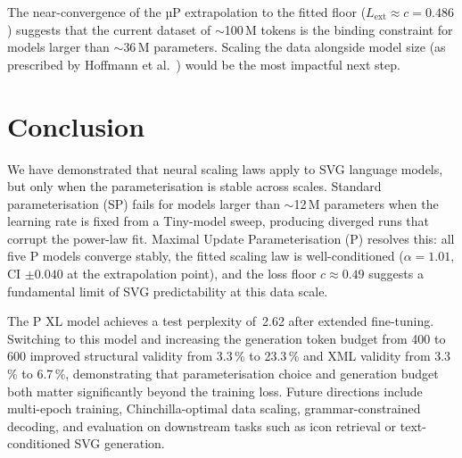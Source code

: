 \documentclass[11pt,a4paper]{article}
\begin{document}
The near-convergence of the µP extrapolation to the fitted floor ($L_\text{ext} \approx c
= 0.486$) suggests that the current dataset of $\sim$100\,M tokens is the binding
constraint for models larger than $\sim$36\,M parameters.  Scaling the data alongside
model size (as prescribed by Hoffmann et al.\ \citeyearpar{hoffmann2022chinchilla}) would
be the most impactful next step.

\section{Conclusion}

We have demonstrated that neural scaling laws apply to SVG language models, but only
when the parameterisation is stable across scales.  Standard parameterisation (SP) fails
for models larger than $\sim$12\,M parameters when the learning rate is fixed from a
Tiny-model sweep, producing diverged runs that corrupt the power-law fit.  Maximal
Update Parameterisation (\textmu P) resolves this: all five \textmu P models converge
stably, the fitted scaling law is well-conditioned ($\alpha = 1.01$, CI $\pm 0.040$ at
the extrapolation point), and the loss floor $c \approx 0.49$ suggests a fundamental
limit of SVG predictability at this data scale.

The \textmu P XL model achieves a test perplexity of~2.62 after extended fine-tuning.
Switching to this model and increasing the generation token budget from 400 to 600
improved structural validity from 3.3\,\% to 23.3\,\% and XML validity from 3.3\,\%
to 6.7\,\%, demonstrating that parameterisation choice and generation budget both
matter significantly beyond the training loss.  Future directions include multi-epoch
training, Chinchilla-optimal data scaling, grammar-constrained decoding, and evaluation
on downstream tasks such as icon retrieval or text-conditioned SVG generation.
\end{document}
